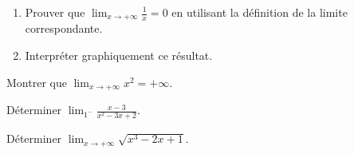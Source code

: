 \begin{mth}
\begin{enumerate}
\item Prouver que $\lim_{x\to +\infty}\frac 1x=0$ en utilisant la définition de la limite correspondante.
\item Interpréter graphiquement ce résultat.
\end{enumerate}
%
%
%
%
%
%
\end{mth}

\begin{mth}
Montrer que $\displaystyle \lim_{x\to +\infty} x^2=+\infty $.
\end{mth}

\begin{mth}
Déterminer $\displaystyle \lim_{1^-}\frac{x-3}{x^2-3x+2}$.
\end{mth}


\begin{mth}
Déterminer $\displaystyle \lim_{x \to +\infty}\sqrt{x^3-2x+1}$.
\end{mth}
